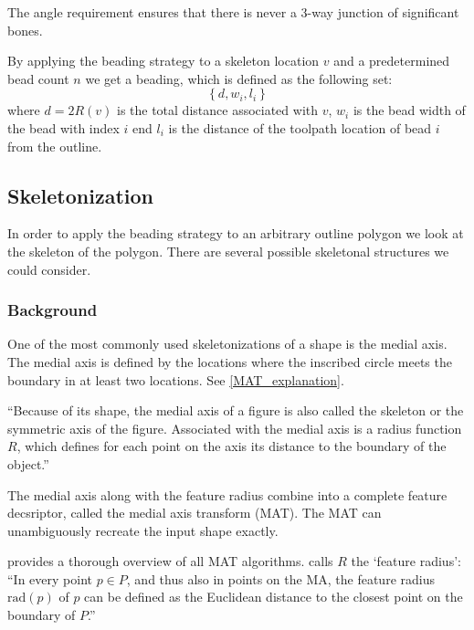 The angle requirement ensures that there is never a 3-way junction of significant bones.

By applying the beading strategy to a skeleton location $v$ and a predetermined bead count $n$ we get a beading, which is defined as the following set:
$$
\left\{ d, w_i, l_i  \right\}
$$
where
$d = 2 R(v)$ is the total distance associated with $v$,
$w_i$ is the bead width of the bead with index $i$
end
$l_i$ is the distance of the toolpath location of bead $i$ from the outline.











\subsection{Skeletonization}
In order to apply the beading strategy to an arbitrary outline polygon we look at the skeleton of the polygon.
There are several possible skeletonal structures we could consider.


\subsubsection{Background}
One of the most commonly used skeletonizations of a shape is the medial axis.
The medial axis is defined by the locations where the inscribed circle meets the boundary in at least two locations. 
See \cref{MAT_explanation}.

``Because of its shape, the medial axis of a figure is also called the skeleton or the symmetric axis of the figure.
Associated with the medial axis is a radius function $R$, which defines for each point on the axis its distance to the boundary of the object.''
\cite{lee1982medial}

The medial axis along with the feature radius combine into a complete feature decsriptor, called the medial axis transform (MAT).
The MAT can unambiguously recreate the input shape exactly. 

\cite{Moesen2011} provides a thorough overview of all MAT algorithms.
\cite{Moesen2011} calls $R$ the `feature radius': ``In every point $p \in P$, and thus also in points on the MA, the feature radius $\text{rad}(p)$ of $p$ can be defined as the Euclidean distance to the closest point on the boundary of $P$.''


